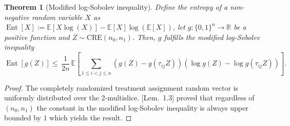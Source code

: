 \documentclass[aos]{imsart2}
\theoremstyle{plain}
\newtheorem{theorem}{Theorem}[section]
\theoremstyle{definition}
\newcommand{\R}{\mathbb{R}}
\newcommand{\E}{\mathbb{E}}
\DeclareMathOperator{\ent}{Ent}
\begin{document}
\begin{appendix}
\begin{theorem}[Modified log-Sobolev inequality]\label{thm:mod-log-sob}
Define the entropy of a non-negative random variable $X$ as $\ent[X] := \E[X\log(X)]-\E[X]\log(\E[X])$, let $g \colon \{0,1\}^n \to \R$ be a positive function and $Z \sim \mathrm{CRE}(n_0,n_1)$. Then, $g$ fulfills the modified log-Sobolev inequality
\begin{equation*}
    \ent[g(Z)] \leq\, \frac{1}{2n}\,  \E\left[\sum_{1\leq i < j \leq n} (g(Z)-g(\tau_{ij}Z))(\log g(Z)-\log g(\tau_{ij}Z))\right].
\end{equation*}
\end{theorem}
\begin{proof}
    The completely randomized treatment assignment random vector is uniformly distributed over the 2-multislice. \cite{salez_sharp_2021}[Lem.~1.3] proved that regardless of $(n_0,n_1)$ the constant in the modified log-Sobolev inequality is always upper bounded by $1$ which yields the result.
\end{proof}



\end{appendix}
\end{document}
